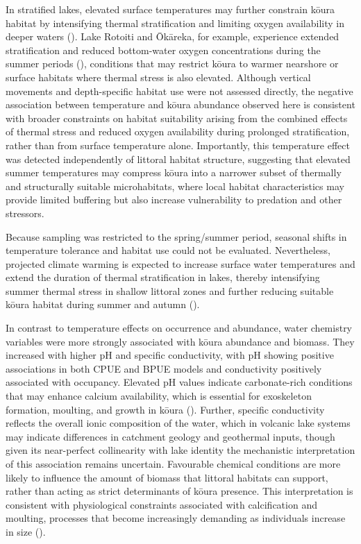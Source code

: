\documentclass[
  letterpaper,
  DIV=11,
  numbers=noendperiod]{scrartcl}
\begin{document}
In stratified lakes, elevated surface temperatures may further constrain
kōura habitat by intensifying thermal stratification and limiting oxygen
availability in deeper waters ().
Lake Rotoiti and Ōkāreka, for example, experience extended
stratification and reduced bottom-water oxygen concentrations during the
summer periods (), conditions that may restrict kōura to warmer nearshore or
surface habitats where thermal stress is also elevated. Although
vertical movements and depth-specific habitat use were not assessed
directly, the negative association between temperature and kōura
abundance observed here is consistent with broader constraints on
habitat suitability arising from the combined effects of thermal stress
and reduced oxygen availability during prolonged stratification, rather
than from surface temperature alone. Importantly, this temperature
effect was detected independently of littoral habitat structure,
suggesting that elevated summer temperatures may compress kōura into a
narrower subset of thermally and structurally suitable microhabitats,
where local habitat characteristics may provide limited buffering but
also increase vulnerability to predation and other stressors.

Because sampling was restricted to the spring/summer period, seasonal
shifts in temperature tolerance and habitat use could not be evaluated.
Nevertheless, projected climate warming is expected to increase surface
water temperatures and extend the duration of thermal stratification in
lakes, thereby intensifying summer thermal stress in shallow littoral
zones and further reducing suitable kōura habitat during summer and
autumn ().

In contrast to temperature effects on occurrence and abundance, water
chemistry variables were more strongly associated with kōura abundance
and biomass. They increased with higher pH and specific conductivity,
with pH showing positive associations in both CPUE and BPUE models and
conductivity positively associated with occupancy. Elevated pH values
indicate carbonate-rich conditions that may enhance calcium
availability, which is essential for exoskeleton formation, moulting,
and growth in kōura ().
Further, specific conductivity reflects the overall ionic composition of
the water, which in volcanic lake systems may indicate differences in
catchment geology and geothermal inputs, though given its near-perfect
collinearity with lake identity the mechanistic interpretation of this
association remains uncertain. Favourable chemical conditions are more
likely to influence the amount of biomass that littoral habitats can
support, rather than acting as strict determinants of kōura presence.
This interpretation is consistent with physiological constraints
associated with calcification and moulting, processes that become
increasingly demanding as individuals increase in size
().
\end{document}
